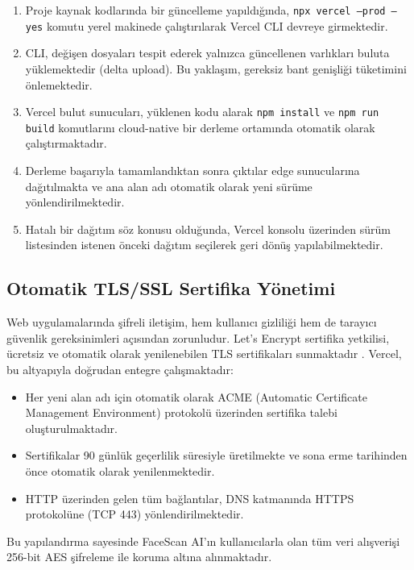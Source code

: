 \begin{enumerate}
  \item Proje kaynak kodlarında bir güncelleme yapıldığında, \texttt{npx vercel --prod --yes} komutu yerel makinede çalıştırılarak Vercel CLI devreye girmektedir.
  \item CLI, değişen dosyaları tespit ederek yalnızca güncellenen varlıkları buluta yüklemektedir (delta upload). Bu yaklaşım, gereksiz bant genişliği tüketimini önlemektedir.
  \item Vercel bulut sunucuları, yüklenen kodu alarak \texttt{npm install} ve \texttt{npm run build} komutlarını cloud-native bir derleme ortamında otomatik olarak çalıştırmaktadır.
  \item Derleme başarıyla tamamlandıktan sonra çıktılar edge sunucularına dağıtılmakta ve ana alan adı otomatik olarak yeni sürüme yönlendirilmektedir.
  \item Hatalı bir dağıtım söz konusu olduğunda, Vercel konsolu üzerinden sürüm listesinden istenen önceki dağıtım seçilerek geri dönüş yapılabilmektedir.
\end{enumerate}

\subsection{Otomatik TLS/SSL Sertifika Yönetimi}

Web uygulamalarında şifreli iletişim, hem kullanıcı gizliliği hem de tarayıcı güvenlik gereksinimleri açısından zorunludur. Let's Encrypt sertifika yetkilisi, ücretsiz ve otomatik olarak yenilenebilen TLS sertifikaları sunmaktadır \cite{letsencrypt2023}. Vercel, bu altyapıyla doğrudan entegre çalışmaktadır:

\begin{itemize}
  \item Her yeni alan adı için otomatik olarak ACME (Automatic Certificate Management Environment) protokolü üzerinden sertifika talebi oluşturulmaktadır.
  \item Sertifikalar 90 günlük geçerlilik süresiyle üretilmekte ve sona erme tarihinden önce otomatik olarak yenilenmektedir.
  \item HTTP üzerinden gelen tüm bağlantılar, DNS katmanında HTTPS protokolüne (TCP 443) yönlendirilmektedir.
\end{itemize}

Bu yapılandırma sayesinde FaceScan AI'ın kullanıcılarla olan tüm veri alışverişi 256-bit AES şifreleme ile koruma altına alınmaktadır.

